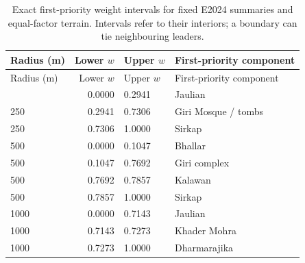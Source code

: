 \begin{longtable}{lrll}
\caption{Exact first-priority weight intervals for fixed E2024 summaries and equal-factor terrain. Intervals refer to their interiors; a boundary can tie neighbouring leaders.}\\
\toprule Radius (m) & Lower $w$ & Upper $w$ & First-priority component\\\midrule
\endfirsthead
\toprule Radius (m) & Lower $w$ & Upper $w$ & First-priority component\\\midrule
\endhead
\bottomrule\endlastfoot
250 & 0.0000 & 0.2941 & Jaulian \\
250 & 0.2941 & 0.7306 & Giri Mosque / tombs \\
250 & 0.7306 & 1.0000 & Sirkap \\
500 & 0.0000 & 0.1047 & Bhallar \\
500 & 0.1047 & 0.7692 & Giri complex \\
500 & 0.7692 & 0.7857 & Kalawan \\
500 & 0.7857 & 1.0000 & Sirkap \\
1000 & 0.0000 & 0.7143 & Jaulian \\
1000 & 0.7143 & 0.7273 & Khader Mohra \\
1000 & 0.7273 & 1.0000 & Dharmarajika \\
\end{longtable}
